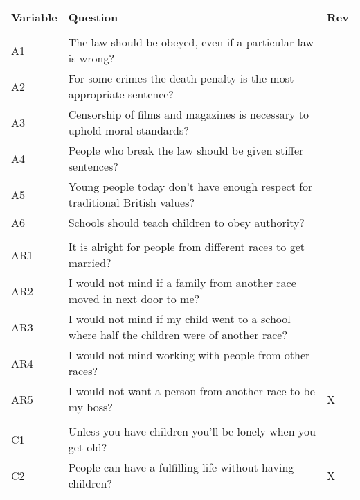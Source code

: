 
\begin{tabular}{lll}
\toprule
Variable & Question & Rev\\
\midrule
\addlinespace[0.3em]
\multicolumn{3}{l}{\textbf{Authority (A)}}\\
\hline
\hspace{1em}A1 & The law should be obeyed, even if a particular law is wrong? & \\
\hspace{1em}A2 & For some crimes the death penalty is the most appropriate sentence? & \\
\hspace{1em}A3 & Censorship of films and magazines is necessary to uphold moral standards? & \\
\hspace{1em}A4 & People who break the law should be given stiffer sentences? & \\
\hspace{1em}A5 & Young people today don't have enough respect for traditional British values? & \\
\hspace{1em}A6 & Schools should teach children to obey authority? & \\
\addlinespace[0.3em]
\multicolumn{3}{l}{\textbf{Anti-Racism (AR)}}\\
\hline
\hspace{1em}AR1 & It is alright for people from different races to get married? & \\
\hspace{1em}AR2 & I would not mind if a family from another race moved in next door to me? & \\
\hspace{1em}AR3 & I would not mind if my child went to a school where half the children were of another race? & \\
\hspace{1em}AR4 & I would not mind working with people from other races? & \\
\hspace{1em}AR5 & I would not want a person from another race to be my boss? & X\\
\addlinespace[0.3em]
\multicolumn{3}{l}{\textbf{Children (C)}}\\
\hline
\hspace{1em}C1 & Unless you have children you'll be lonely when you get old? & \\
\hspace{1em}C2 & People can have a fulfilling life without having children? & X\\

\end{tabular}
